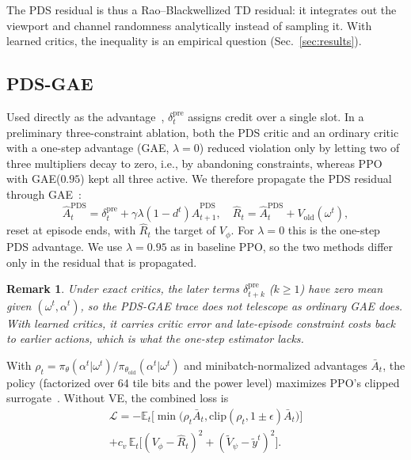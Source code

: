 \documentclass[conference]{IEEEtran}
\newtheorem{remark}{Remark}
\newcommand{\EE}{\mathbb{E}}
\newcommand{\om}{\omega}
\newcommand{\Vt}{\widetilde{V}}
\newcommand{\Vold}{V_{\mathrm{old}}}
\begin{document}
The PDS residual is thus a Rao--Blackwellized TD residual: it integrates out the viewport and channel randomness analytically instead of sampling it. With learned critics, the inequality is an empirical question (Sec.~\ref{sec:results}).

\subsection{PDS-GAE}
Used directly as the advantage~\cite{lu2026resource}, $\delta_t^{\mathrm{pre}}$ assigns credit over a single slot. In a preliminary three-constraint ablation, both the PDS critic and an ordinary critic with a one-step advantage (GAE, $\lambda=0$) reduced violation only by letting two of three multipliers decay to zero, i.e., by abandoning constraints, whereas PPO with GAE($0.95$) kept all three active. We therefore propagate the PDS residual through GAE~\cite{schulman2016gae}:
\begin{equation}
\widehat A_t^{\mathrm{PDS}}=\delta_t^{\mathrm{pre}}+\gamma\lambda(1-d^t)\widehat A_{t+1}^{\mathrm{PDS}},\quad
\widehat R_t=\widehat A_t^{\mathrm{PDS}}+\Vold(\om^t),
\label{eq:pdsgae}
\end{equation}
reset at episode ends, with $\widehat R_t$ the target of $V_\phi$. For $\lambda=0$ this is the one-step PDS advantage. We use $\lambda=0.95$ as in baseline PPO, so the two methods differ only in the residual that is propagated.

\begin{remark}
Under exact critics, the later terms $\delta_{t+k}^{\mathrm{pre}}$ ($k\ge1$) have zero mean given $(\om^t,\alpha^t)$, so the PDS-GAE trace does not telescope as ordinary GAE does. With learned critics, it carries critic error and late-episode constraint costs back to earlier actions, which is what the one-step estimator lacks.
\end{remark}

With $\rho_t=\pi_\theta(\alpha^t|\om^t)/\pi_{\theta_{\mathrm{old}}}(\alpha^t|\om^t)$ and minibatch-normalized advantages $\bar A_t$, the policy (factorized over 64 tile bits and the power level) maximizes PPO's clipped surrogate~\cite{schulman2017ppo}. Without VE, the combined loss is
\begin{multline}
\mathcal{L}=-\EE_t\big[\min\big(\rho_t\bar A_t,\mathrm{clip}(\rho_t,1\pm\epsilon)\bar A_t\big)\big]\\
+c_v\,\EE_t\big[(V_\phi-\widehat R_t)^2+(\Vt_\psi-\widetilde y^t)^2\big].
\label{eq:loss}
\end{multline}
\end{document}
